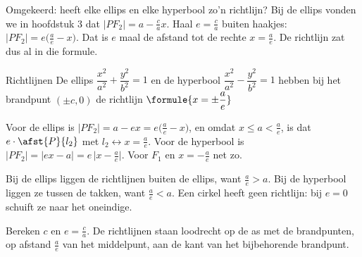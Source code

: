 Omgekeerd: heeft elke ellips en elke hyperbool zo'n richtlijn? Bij de ellips vonden we in hoofdstuk 3 dat $|PF_2| = a - \tfrac ca x$. Haal $e = \tfrac ca$ buiten haakjes: $|PF_2| = e\bigl(\tfrac ae - x\bigr)$. Dat is $e$ maal de afstand tot de rechte $x = \tfrac ae$. De richtlijn zat dus al in die formule.

\begin{theorie}
\begin{stelling}{Richtlijnen}
De ellips $\dfrac{x^2}{a^2} + \dfrac{y^2}{b^2} = 1$ en de hyperbool $\dfrac{x^2}{a^2} - \dfrac{y^2}{b^2} = 1$ hebben bij het brandpunt $(\pm c, 0)$ de richtlijn \qquad $\formule{x = \pm\dfrac ae}$
\end{stelling}

\begin{bewijs}
Voor de ellips is $|PF_2| = a - ex = e\bigl(\tfrac ae - x\bigr)$, en omdat $x \leqslant a < \tfrac ae$, is dat $e \cdot \afst{P}{l_2}$ met $l_2 \leftrightarrow x = \tfrac ae$. Voor de hyperbool is $|PF_2| = |ex - a| = e\,\bigl|x - \tfrac ae\bigr|$. Voor $F_1$ en $x = -\tfrac ae$ net zo.
\end{bewijs}
\end{theorie}

Bij de ellips liggen de richtlijnen buiten de ellips, want $\tfrac ae > a$. Bij de hyperbool liggen ze tussen de takken, want $\tfrac ae < a$. Een cirkel heeft geen richtlijn: bij $e = 0$ schuift ze naar het oneindige.


\begin{werkwijze}
Bereken $c$ en $e = \tfrac ca$. De richtlijnen staan loodrecht op de as met de brandpunten, op afstand $\tfrac ae$ van het middelpunt, aan de kant van het bijbehorende brandpunt.
\end{werkwijze}

